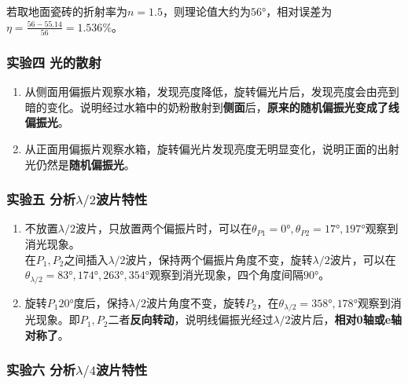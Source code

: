 \documentclass[dvipsnames, svgnames,a4paper,11pt]{article}
\begin{document}
	若取地面瓷砖的折射率为$n=1.5$，则理论值大约为$\ang{56}$，相对误差为$\eta=\frac{56-55.14}{56}=1.536\%$。



	\subsubsection{实验四 \quad 光的散射}

	\begin{enumerate}
		\item 从侧面用偏振片观察水箱，发现亮度降低，旋转偏光片后，发现亮度会由亮到暗的变化。说明经过水箱中的奶粉散射到\textbf{侧面}后，\textbf{原来的随机偏振光变成了线偏振光}。
		\item 从正面用偏振片观察水箱，旋转偏光片发现亮度无明显变化，说明正面的出射光仍然是\textbf{随机偏振光}。
	\end{enumerate}
	
	





	\subsubsection{实验五 \quad 分析$\lambda/2$波片特性}

	\begin{enumerate}
		\item 不放置$\lambda/2$波片，只放置两个偏振片时，可以在$\theta_{P1}=\ang{0},\theta_{P2}=\ang{17},\ang{197}$观察到消光现象。	\\
			在$P_1,P_2$之间插入$\lambda/2$波片，保持两个偏振片角度不变，旋转$\lambda/2$波片，可以在$\theta_{\lambda/2}=\ang{83},\ang{174},\ang{263},\ang{354}$观察到消光现象，四个角度间隔$\ang{90}$。
		\item 旋转$P_1\ang{20}$度后，保持$\lambda/2$波片角度不变，旋转$P_2$，在$\theta_{\lambda/2}=\ang{358},\ang{178}$观察到消光现象。即$P_1,P_2$二者\textbf{反向转动}，说明线偏振光经过$\lambda/2$波片后，\textbf{相对0轴或e轴对称了}。
	\end{enumerate}
	







	\subsubsection{实验六 \quad 分析$\lambda/4$波片特性}
\end{document}
